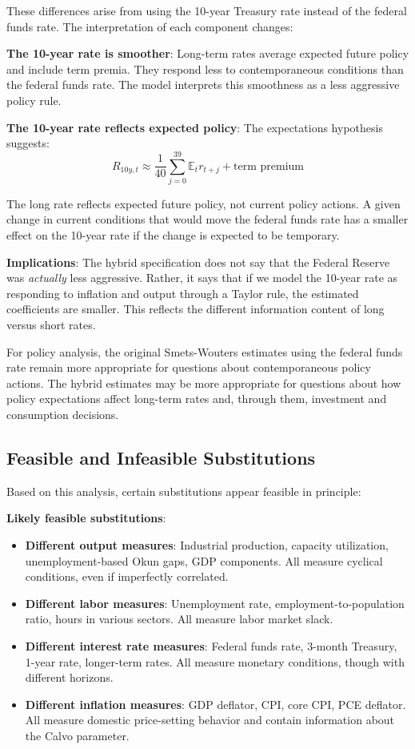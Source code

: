 \documentclass[12pt]{article}
\begin{document}
These differences arise from using the 10-year Treasury rate instead of the federal funds rate. The interpretation of each component changes:

\textbf{The 10-year rate is smoother}: Long-term rates average expected future policy and include term premia. They respond less to contemporaneous conditions than the federal funds rate. The model interprets this smoothness as a less aggressive policy rule.

\textbf{The 10-year rate reflects expected policy}: The expectations hypothesis suggests:
\[
R_{10y,t} \approx \frac{1}{40}\sum_{j=0}^{39}\mathbb{E}_t r_{t+j} + \text{term premium}
\]

The long rate reflects expected future policy, not current policy actions. A given change in current conditions that would move the federal funds rate has a smaller effect on the 10-year rate if the change is expected to be temporary.

\textbf{Implications}: The hybrid specification does not say that the Federal Reserve was \textit{actually} less aggressive. Rather, it says that if we model the 10-year rate as responding to inflation and output through a Taylor rule, the estimated coefficients are smaller. This reflects the different information content of long versus short rates.

For policy analysis, the original Smets-Wouters estimates using the federal funds rate remain more appropriate for questions about contemporaneous policy actions. The hybrid estimates may be more appropriate for questions about how policy expectations affect long-term rates and, through them, investment and consumption decisions.

\subsection{Feasible and Infeasible Substitutions}

Based on this analysis, certain substitutions appear feasible in principle:

\textbf{Likely feasible substitutions}:
\begin{itemize}
    \item \textbf{Different output measures}: Industrial production, capacity utilization, unemployment-based Okun gaps, GDP components. All measure cyclical conditions, even if imperfectly correlated.
    
    \item \textbf{Different labor measures}: Unemployment rate, employment-to-population ratio, hours in various sectors. All measure labor market slack.
    
    \item \textbf{Different interest rate measures}: Federal funds rate, 3-month Treasury, 1-year rate, longer-term rates. All measure monetary conditions, though with different horizons.
    
    \item \textbf{Different inflation measures}: GDP deflator, CPI, core CPI, PCE deflator. All measure domestic price-setting behavior and contain information about the Calvo parameter.
\end{itemize}
\end{document}
